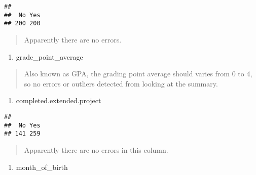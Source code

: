 \documentclass[
]{article}
\newenvironment{Shaded}{\begin{snugshade}}{\end{snugshade}}
\newcommand{\FunctionTok}[1]{\textcolor[rgb]{0.13,0.29,0.53}{\textbf{#1}}}
\newcommand{\NormalTok}[1]{#1}
\newcommand{\SpecialCharTok}[1]{\textcolor[rgb]{0.81,0.36,0.00}{\textbf{#1}}}
\providecommand{\tightlist}{%
  \setlength{\itemsep}{0pt}\setlength{\parskip}{0pt}}
\begin{document}
\begin{verbatim}
## 
##  No Yes 
## 200 200
\end{verbatim}

\begin{quote}
Apparently there are no errors.
\end{quote}

\begin{enumerate}
\def\labelenumi{\arabic{enumi}.}
\setcounter{enumi}{5}
\tightlist
\item
  grade\_point\_average
\end{enumerate}

\begin{quote}
Also known as GPA, the grading point average should varies from 0 to 4,
so no errors or outliers detected from looking at the summary.
\end{quote}

\begin{enumerate}
\def\labelenumi{\arabic{enumi}.}
\setcounter{enumi}{6}
\tightlist
\item
  completed.extended.project
\end{enumerate}

\begin{Shaded}
\end{Shaded}

\begin{verbatim}
## 
##  No Yes 
## 141 259
\end{verbatim}

\begin{quote}
Apparently there are no errors in this column.
\end{quote}

\begin{enumerate}
\def\labelenumi{\arabic{enumi}.}
\setcounter{enumi}{7}
\tightlist
\item
  month\_of\_birth
\end{enumerate}

\begin{Shaded}
\end{Shaded}
\end{document}
